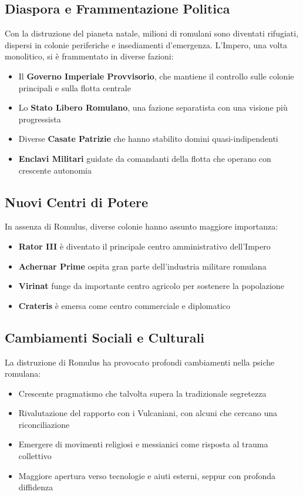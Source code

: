 \documentclass[letterpaper,twocolumn,openany,nodeprecatedcode]{dndbook}
\begin{document}
\subsection{Diaspora e Frammentazione Politica
}
Con la distruzione del pianeta natale, milioni di romulani sono diventati rifugiati, dispersi in colonie periferiche e insediamenti d'emergenza. L'Impero, una volta monolitico, si è frammentato in diverse fazioni:

\begin{itemize}
    \item Il \textbf{Governo Imperiale Provvisorio}, che mantiene il controllo sulle colonie principali e sulla flotta centrale
    \item Lo \textbf{Stato Libero Romulano}, una fazione separatista con una visione più progressista
    \item Diverse \textbf{Casate Patrizie} che hanno stabilito domini quasi-indipendenti
    \item \textbf{Enclavi Militari} guidate da comandanti della flotta che operano con crescente autonomia
\end{itemize}

\subsection{Nuovi Centri di Potere}
In assenza di Romulus, diverse colonie hanno assunto maggiore importanza:

\begin{itemize}
    \item \textbf{Rator III} è diventato il principale centro amministrativo dell'Impero
    \item \textbf{Achernar Prime} ospita gran parte dell'industria militare romulana
    \item \textbf{Virinat} funge da importante centro agricolo per sostenere la popolazione
    \item \textbf{Crateris} è emersa come centro commerciale e diplomatico
\end{itemize}

\subsection{Cambiamenti Sociali e Culturali}
La distruzione di Romulus ha provocato profondi cambiamenti nella psiche romulana:

\begin{itemize}
    \item Crescente pragmatismo che talvolta supera la tradizionale segretezza
    \item Rivalutazione del rapporto con i Vulcaniani, con alcuni che cercano una riconciliazione
    \item Emergere di movimenti religiosi e messianici come risposta al trauma collettivo
    \item Maggiore apertura verso tecnologie e aiuti esterni, seppur con profonda diffidenza
\end{itemize}
\end{document}
